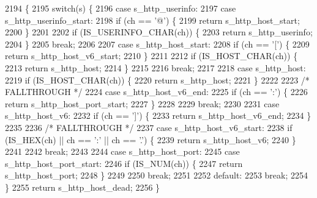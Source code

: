 \begin{DoxyCode}
2194                                                             \{
2195   \textcolor{keywordflow}{switch}(s) \{
2196     \textcolor{keywordflow}{case} s_http_userinfo:
2197     \textcolor{keywordflow}{case} s_http_userinfo_start:
2198       \textcolor{keywordflow}{if} (ch == \textcolor{charliteral}{'@'}) \{
2199         \textcolor{keywordflow}{return} s_http_host_start;
2200       \}
2201 
2202       \textcolor{keywordflow}{if} (IS_USERINFO_CHAR(ch)) \{
2203         \textcolor{keywordflow}{return} s_http_userinfo;
2204       \}
2205       \textcolor{keywordflow}{break};
2206 
2207     \textcolor{keywordflow}{case} s_http_host_start:
2208       \textcolor{keywordflow}{if} (ch == \textcolor{charliteral}{'['}) \{
2209         \textcolor{keywordflow}{return} s_http_host_v6_start;
2210       \}
2211 
2212       \textcolor{keywordflow}{if} (IS_HOST_CHAR(ch)) \{
2213         \textcolor{keywordflow}{return} s_http_host;
2214       \}
2215 
2216       \textcolor{keywordflow}{break};
2217 
2218     \textcolor{keywordflow}{case} s_http_host:
2219       \textcolor{keywordflow}{if} (IS_HOST_CHAR(ch)) \{
2220         \textcolor{keywordflow}{return} s_http_host;
2221       \}
2222 
2223     \textcolor{comment}{/* FALLTHROUGH */}
2224     \textcolor{keywordflow}{case} s_http_host_v6_end:
2225       \textcolor{keywordflow}{if} (ch == \textcolor{charliteral}{':'}) \{
2226         \textcolor{keywordflow}{return} s_http_host_port_start;
2227       \}
2228 
2229       \textcolor{keywordflow}{break};
2230 
2231     \textcolor{keywordflow}{case} s_http_host_v6:
2232       \textcolor{keywordflow}{if} (ch == \textcolor{charliteral}{']'}) \{
2233         \textcolor{keywordflow}{return} s_http_host_v6_end;
2234       \}
2235 
2236     \textcolor{comment}{/* FALLTHROUGH */}
2237     \textcolor{keywordflow}{case} s_http_host_v6_start:
2238       \textcolor{keywordflow}{if} (IS_HEX(ch) || ch == \textcolor{charliteral}{':'} || ch == \textcolor{charliteral}{'.'}) \{
2239         \textcolor{keywordflow}{return} s_http_host_v6;
2240       \}
2241 
2242       \textcolor{keywordflow}{break};
2243 
2244     \textcolor{keywordflow}{case} s_http_host_port:
2245     \textcolor{keywordflow}{case} s_http_host_port_start:
2246       \textcolor{keywordflow}{if} (IS_NUM(ch)) \{
2247         \textcolor{keywordflow}{return} s_http_host_port;
2248       \}
2249 
2250       \textcolor{keywordflow}{break};
2251 
2252     \textcolor{keywordflow}{default}:
2253       \textcolor{keywordflow}{break};
2254   \}
2255   \textcolor{keywordflow}{return} s_http_host_dead;
2256 \}
\end{DoxyCode}
